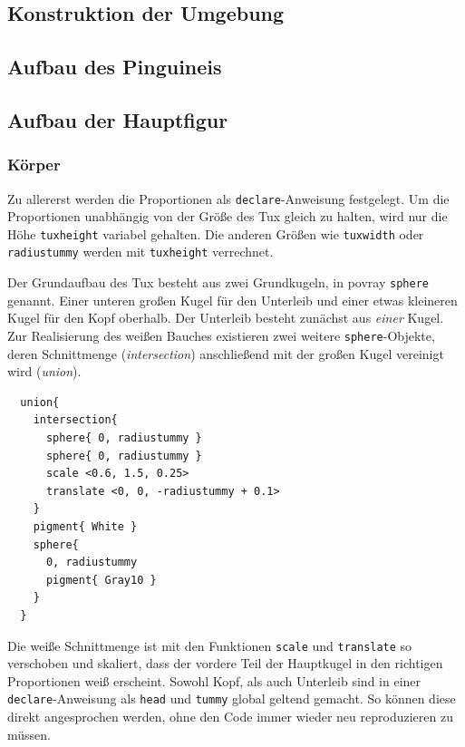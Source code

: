 \documentclass[11pt,parskip]{scrartcl}
\begin{document}
\subsection{Konstruktion der Umgebung}


\subsection{Aufbau des Pinguineis}


\subsection{Aufbau der Hauptfigur}


\subsubsection{Körper}
Zu allererst werden die Proportionen als \texttt{declare}-Anweisung festgelegt.
Um die Proportionen unabhängig von der Größe des Tux gleich zu halten, wird
nur die Höhe \texttt{tuxheight} variabel gehalten. Die anderen Größen wie
\texttt{tuxwidth} oder \texttt{radiustummy} werden mit \texttt{tuxheight}
verrechnet.

Der Grundaufbau des Tux besteht aus zwei Grundkugeln, in povray \texttt{sphere}
genannt. Einer unteren großen Kugel für den Unterleib und einer etwas kleineren
Kugel für den Kopf oberhalb. Der Unterleib besteht zunächst aus \emph{einer}
Kugel. Zur Realisierung des weißen Bauches existieren zwei weitere
\texttt{sphere}-Objekte, deren Schnittmenge (\emph{intersection}) anschließend
mit der großen Kugel vereinigt wird (\emph{union}).

\begin{lstlisting}
  union{
    intersection{
      sphere{ 0, radiustummy }
      sphere{ 0, radiustummy }
      scale <0.6, 1.5, 0.25>
      translate <0, 0, -radiustummy + 0.1>
    }
    pigment{ White }
    sphere{
      0, radiustummy
      pigment{ Gray10 }
    }
  }
\end{lstlisting}

Die weiße Schnittmenge ist mit den Funktionen \texttt{scale} und
\texttt{translate} so verschoben und skaliert, dass der vordere Teil der
Hauptkugel in den richtigen Proportionen weiß erscheint. Sowohl Kopf, als auch
Unterleib sind in einer \texttt{declare}-Anweisung als \texttt{head} und
\texttt{tummy} global geltend gemacht. So können diese direkt angesprochen
werden, ohne den Code immer wieder neu reproduzieren zu müssen.
\end{document}
